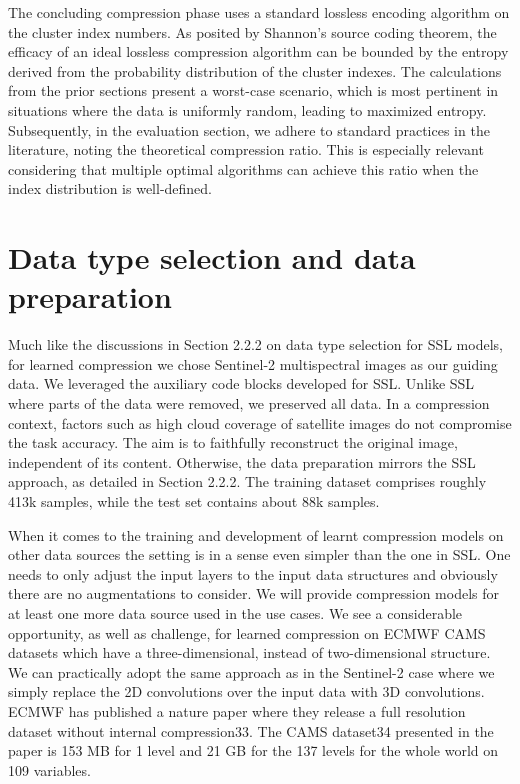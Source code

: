 \documentclass[runningheads]{llncs}
\begin{document}
The concluding compression phase uses a standard lossless encoding algorithm on the cluster index 
numbers. As posited by Shannon's source coding theorem, the efficacy of an ideal lossless 
compression algorithm can be bounded by the entropy derived from the probability distribution of 
the cluster indexes. The calculations from the prior sections present a worst-case scenario, which is 
most pertinent in situations where the data is uniformly random, leading to maximized entropy. 
Subsequently, in the evaluation section, we adhere to standard practices in the literature, noting the 
theoretical compression ratio. This is especially relevant considering that multiple optimal algorithms 
can achieve this ratio when the index distribution is well-defined. 

\section{Data type selection and data preparation}
Much like the discussions in Section 2.2.2 on data type selection for SSL models, for learned 
compression we chose Sentinel-2 multispectral images as our guiding data. We leveraged the auxiliary 
code blocks developed for SSL. Unlike SSL where parts of the data were removed, we preserved all 
data. In a compression context, factors such as high cloud coverage of satellite images do not 
compromise the task accuracy. The aim is to faithfully reconstruct the original image, independent of 
its content. Otherwise, the data preparation mirrors the SSL approach, as detailed in Section 2.2.2. 
The training dataset comprises roughly 413k samples, while the test set contains about 88k samples. 
 
When it comes to the training and development of learnt compression models on other data sources 
the setting is in a sense even simpler than the one in SSL. One needs to only adjust the input layers to 
the input data structures and obviously there are no augmentations to consider. We will provide 
compression models for at least one more data source used in the use cases. We see a considerable 
opportunity, as well as challenge, for learned compression on ECMWF CAMS datasets which have a 
three-dimensional, instead of two-dimensional structure.  We can practically adopt the same 
approach as in the Sentinel-2 case where we simply replace the 2D convolutions over the input data 
with 3D convolutions. ECMWF has published a nature paper where they release a full resolution 
dataset without internal compression33. The CAMS dataset34 presented in the paper is 153 MB for 1 
level and 21 GB for the 137 levels for the whole world on 109 variables. 
 
\end{document}
